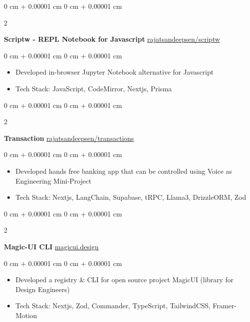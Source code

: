 \documentclass[10pt, letterpaper]{article}
\newenvironment{highlights}{
    \begin{itemize}[
        topsep=0.10 cm,
        parsep=0.10 cm,
        partopsep=0pt,
        itemsep=0pt,
        leftmargin=0 cm + 10pt
    ]
}{
    \end{itemize}
} %
\newenvironment{onecolentry}{
    \begin{adjustwidth}{
        0 cm + 0.00001 cm
    }{
        0 cm + 0.00001 cm
    }
}{
    \end{adjustwidth}
} %
\newenvironment{twocolentry}[2][]{
    \onecolentry
    \def\secondColumn{#2}
    \setcolumnwidth{\fill, 4.5 cm}
    \begin{paracol}{2}
}{
    \switchcolumn \raggedleft \secondColumn
    \end{paracol}
    \endonecolentry
} %
\begin{document}
\begin{twocolentry}{
        \href{https://github.com/rajatsandeepsen/scriptw}{rajatsandeepsen/scriptw}
    }
    \textbf{Scriptw - REPL Notebook for Javascript}\end{twocolentry}

\vspace{0.10 cm}
\begin{onecolentry}
    \begin{highlights}
        \item Developed in-browser Jupyter Notebook alternative for Javascript
        \item Tech Stack: JavaScript, CodeMirror, Nextjs, Prisma
    \end{highlights}
\end{onecolentry}
\vspace{0.2 cm}

\begin{twocolentry}{
        \href{https://github.com/rajatsandeepsen/transactions}{rajatsandeepsen/transactions}
    }
    \textbf{Transaction}\end{twocolentry}

\vspace{0.10 cm}
\begin{onecolentry}
    \begin{highlights}
        \item Developed hands free banking app that can be controlled using Voice as
        Engineering Mini-Project
        \item Tech Stack: Nextjs, LangChain, Supabase, tRPC, Llama3, DrizzleORM, Zod
    \end{highlights}
\end{onecolentry}
\vspace{0.2 cm}

\begin{twocolentry}{
        \href{https://magicui.design/}{magicui.design}
    }
    \textbf{Magic-UI CLI}\end{twocolentry}

\vspace{0.10 cm}
\begin{onecolentry}
    \begin{highlights}
        \item Developed a registry \& CLI for open source project MagicUI (library for Design
        Engineers)
        \item Tech Stack: Nextjs, Zod, Commander, TypeScript, TailwindCSS, Framer-Motion
    \end{highlights}
\end{onecolentry}
\end{document}
